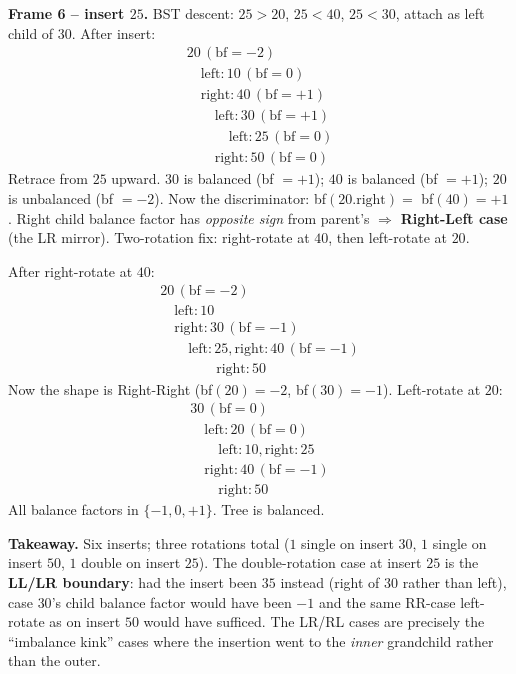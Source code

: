 \documentclass[11pt]{article}
\begin{document}
\begin{examplebox}
\textbf{Frame 6 -- insert $25$.} BST descent: $25 > 20$, $25 < 40$,
$25 < 30$, attach as left child of $30$. After insert:
\[
\begin{array}{l}
20 \,(\text{bf} = -2) \\
\quad \text{left}: 10 \,(\text{bf} = 0) \\
\quad \text{right}: 40 \,(\text{bf} = +1) \\
\qquad \text{left}: 30 \,(\text{bf} = +1) \\
\qquad\quad \text{left}: 25 \,(\text{bf} = 0) \\
\qquad \text{right}: 50 \,(\text{bf} = 0)
\end{array}
\]
Retrace from $25$ upward. $30$ is balanced (bf $= +1$); $40$ is
balanced (bf $= +1$); $20$ is unbalanced (bf $= -2$). Now the
discriminator: bf$(20.\text{right}) = $ bf$(40) = +1$. Right child
balance factor has \emph{opposite sign} from parent's
$\Rightarrow$ \textbf{Right-Left case} (the LR mirror). Two-rotation
fix: right-rotate at $40$, then left-rotate at $20$.

After right-rotate at $40$:
\[
\begin{array}{l}
20 \,(\text{bf} = -2) \\
\quad \text{left}: 10 \\
\quad \text{right}: 30 \,(\text{bf} = -1) \\
\qquad \text{left}: 25, \text{right}: 40 \,(\text{bf} = -1) \\
\qquad\qquad \text{right}: 50
\end{array}
\]
Now the shape is Right-Right (bf$(20) = -2$, bf$(30) = -1$).
Left-rotate at $20$:
\[
\begin{array}{l}
30 \,(\text{bf} = 0) \\
\quad \text{left}: 20 \,(\text{bf} = 0) \\
\qquad \text{left}: 10, \text{right}: 25 \\
\quad \text{right}: 40 \,(\text{bf} = -1) \\
\qquad \text{right}: 50
\end{array}
\]
All balance factors in $\{-1, 0, +1\}$. Tree is balanced.

\textbf{Takeaway.} Six inserts; three rotations total ($1$ single
on insert $30$, $1$ single on insert $50$, $1$ double on insert
$25$). The double-rotation case at insert $25$ is the
\textbf{LL/LR boundary}: had the insert been $35$ instead (right of
$30$ rather than left), case $30$'s child balance factor would have
been $-1$ and the same RR-case left-rotate as on insert $50$ would
have sufficed. The LR/RL cases are precisely the
``imbalance kink'' cases where the insertion went to the
\emph{inner} grandchild rather than the outer.
\end{examplebox}
\end{document}
